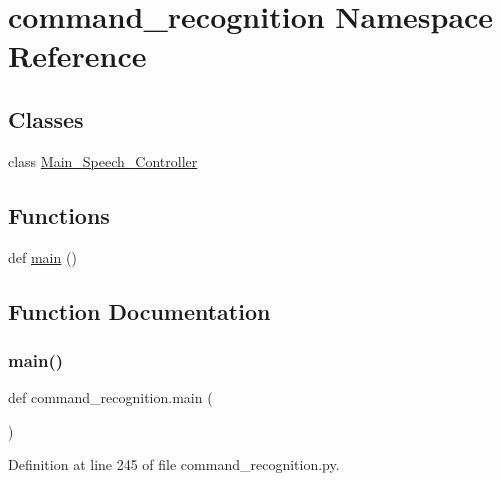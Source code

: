 \hypertarget{namespacecommand__recognition}{}\section{command\+\_\+recognition Namespace Reference}
\label{namespacecommand__recognition}
\subsection*{Classes}
\begin{DoxyCompactItemize}
\item 
class \hyperlink{classcommand__recognition_1_1_main___speech___controller}{Main\+\_\+\+Speech\+\_\+\+Controller}
\end{DoxyCompactItemize}
\subsection*{Functions}
\begin{DoxyCompactItemize}
\item 
def \hyperlink{namespacecommand__recognition_a7ea48f781ea104f0a02f0b755f671b52}{main} ()
\end{DoxyCompactItemize}


\subsection{Function Documentation}
\mbox{\label{namespacecommand__recognition_a7ea48f781ea104f0a02f0b755f671b52}} 
\subsubsection{\texorpdfstring{main()}{main()}}
{\footnotesize\ttfamily def command\+\_\+recognition.\+main (\begin{DoxyParamCaption}{ }\end{DoxyParamCaption})}



Definition at line 245 of file command\+\_\+recognition.\+py.

